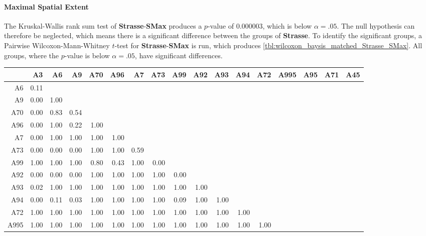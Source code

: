 \paragraph{Maximal Spatial Extent}
The Kruskal-Wallis rank sum test of \textbf{Strasse}-\textbf{SMax} produces a $p$-value of 0.000003, which is below $\alpha=.05$. The null hypothesis can therefore be neglected, which means there is a significant difference between the groups of \textbf{Strasse}. To identify the significant groups, a Pairwise Wilcoxon-Mann-Whitney $t$-test for \textbf{Strasse}-\textbf{SMax} is run, which produces \autoref{tbl:wilcoxon_baysis_matched_Strasse_SMax}. All groups, where the $p$-value is below $\alpha=.05$, have significant differences. 
\begin{table}[ht]
	\tiny
	\setlength{\tabcolsep}{4pt}
	\centering
	\begin{tabular}{rrrrrrrrrrrrrrrrr}
		\toprule
				& A3   & A6   & A9   & A70  & A96  & A7   & A73   & A99 & A92 & A93 & A94 & A72 & A995 & A95 & A71 & A45 \\ 
		\midrule
		A6 		& 0.11 &  &  &  &  &  &  &  &  &  &  &  &  &  &  &  \\ 
		A9 		& 0.00 & 1.00 &  &  &  &  &  &  &  &  &  &  &  &  &  &  \\ 
		A70 	& 0.00 & 0.83 & 0.54 &  &  &  &  &  &  &  &  &  &  &  &  &  \\ 
		A96 	& 0.00 & 1.00 & 0.22 & 1.00 &  &  &  &  &  &  &  &  &  &  &  &  \\ 
		A7 		& 0.00 & 1.00 & 1.00 & 1.00 & 1.00 &  &  &  &  &  &  &  &  &  &  &  \\ 
		A73 	& 0.00 & 0.00 & 0.00 & 1.00 & 1.00 & 0.59 &  &  &  &  &  &  &  &  &  &  \\ 
		A99 	& 1.00 & 1.00 & 1.00 & 0.80 & 0.43 & 1.00 & 0.00 &  &  &  &  &  &  &  &  &  \\ 
		A92 	& 0.00 & 0.00 & 0.00 & 1.00 & 1.00 & 1.00 & 1.00 & 0.00 &  &  &  &  &  &  &  &  \\ 
		A93 	& 0.02 & 1.00 & 1.00 & 1.00 & 1.00 & 1.00 & 1.00 & 1.00 & 1.00 &  &  &  &  &  &  &  \\ 
		A94 	& 0.00 & 0.11 & 0.03 & 1.00 & 1.00 & 1.00 & 1.00 & 0.09 & 1.00 & 1.00 &  &  &  &  &  &  \\ 
		A72 	& 1.00 & 1.00 & 1.00 & 1.00 & 1.00 & 1.00 & 1.00 & 1.00 & 1.00 & 1.00 & 1.00 &  &  &  &  &  \\ 
		A995 	& 1.00 & 1.00 & 1.00 & 1.00 & 1.00 & 1.00 & 1.00 & 1.00 & 1.00 & 1.00 & 1.00 & 1.00 &  &  &  &  \\ 

\end{tabular}
\end{table}
